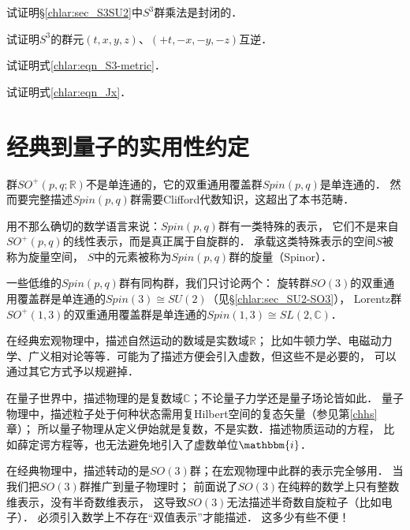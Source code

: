 \begin{exercise}
	试证明\S\ref{chlar:sec_S3SU2}中$S^3$群乘法是封闭的．
\end{exercise}

\begin{exercise}
	试证明$S^3$的群元$(t,x,y,z)$、$(+t,-x,-y,-z)$互逆．
\end{exercise}

\begin{exercise}
	试证明式\eqref{chlar:eqn_S3-metric}．
\end{exercise}

\begin{exercise}
	试证明式\eqref{chlar:eqn_Jx}．
\end{exercise}



\section{经典到量子的实用性约定}\label{chlar:sec_C2Q}


群$SO^{+}(p,q;\mathbb{R})$不是单连通的，它的双重通用覆盖群$Spin(p,q)$是单连通的．
然而要完整描述$Spin(p,q)$群需要Clifford代数知识\cite{lawson-1990-spin}，这超出了本书范畴．

用不那么确切的数学语言来说：$Spin(p,q)$群有一类特殊的表示，
它们不是来自$SO^{+}(p,q)$的线性表示，而是真正属于自旋群的．
承载这类特殊表示的空间$S$被称为{\heiti 旋量空间}，
$S$中的元素被称为$Spin(p,q)$群的{\heiti 旋量}（Spinor）．


一些低维的$Spin(p,q)$群有同构群，我们只讨论两个：
旋转群$SO(3)$的双重通用覆盖群是单连通的$Spin(3)  \cong SU(2)$（见\S\ref{chlar:sec_SU2-SO3}），
Lorentz群$SO^{+}(1,3)$的双重通用覆盖群是单连通的$Spin(1,3)\cong SL(2,\mathbb{C})$．

在经典宏观物理中，描述自然运动的数域是实数域$\mathbb{R}$；
比如牛顿力学、电磁动力学、广义相对论等等．可能为了描述方便会引入虚数，但这些不是必要的，
可以通过其它方式予以规避掉．

在量子世界中，描述物理的是复数域$\mathbb{C}$；不论量子力学还是量子场论皆如此．
量子物理中，描述粒子处于何种状态需用复Hilbert空间的复态矢量（参见第\ref{chhs}章）；
所以量子物理从定义伊始就是复数，不是实数．描述物质运动的方程，
比如薛定谔方程等，也无法避免地引入了虚数单位$\mathbbm{i}$．

在经典物理中，描述转动的是$SO(3)$群；在宏观物理中此群的表示完全够用．
当我们把$SO(3)$群推广到量子物理时；
前面说了$SO(3)$在纯粹的数学上只有整数维表示，没有半奇数维表示，
这导致$SO(3)$无法描述半奇数自旋粒子（比如电子）．
必须引入数学上不存在“双值表示”才能描述．
这多少有些不便！

